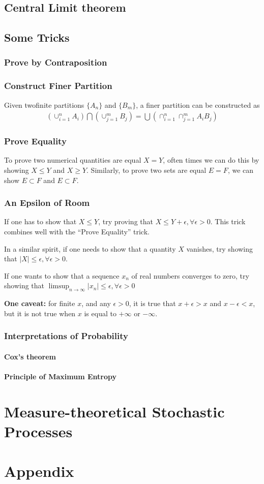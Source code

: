 \documentclass{memoir}
\begin{document}
\chapter{Central Limit theorem}

\chapter{Some Tricks}
\section{Prove by Contraposition}

\section{Construct Finer Partition}
Given twofinite partitions $\{A_n\}$ and $\{B_m\}$, a finer partition can be constructed as
\begin{align*}
	(\cup_{i=1}^n A_i) \bigcap (\cup_{j=1}^m B_j) = \bigcup (\cap_{i=1}^n \cap_{j=1}^m A_i B_j)
\end{align*}

\section{Prove Equality}
To prove two numerical quantities are equal $X=Y$, often times we can do this by showing $X \le Y$ and $X \ge Y$. Similarly, to prove two sets are equal $E = F$, we can show $E \subset F$ and $E \subset F$.

\section{An Epsilon of Room}
If one has to show that $X \le Y$, try proving that $X \le Y + \epsilon, \forall \epsilon > 0$. This trick combines well with the ``Prove Equality'' trick.

In a similar spirit, if one needs to show that a quantity $X$ vanishes, try showing that $|X| \le \epsilon, \forall \epsilon > 0$.

If one wants to show that a sequence $x_n$ of real numbers converges to zero, try showing that $\limsup_{n \to \infty} |x_n| \le \epsilon, \forall \epsilon > 0$

{\textbf{One caveat:}} for finite $x$, and any $\epsilon > 0$, it is true that $x + \epsilon > x$ and $x - \epsilon < x$, but it is not true when $x$ is equal to $+\infty$ or $-\infty$. \smallmarginpar{\textdbend}


\section{Interpretations of Probability}
\subsection{Cox's theorem}
\subsection{Principle of Maximum Entropy}

\part{Measure-theoretical Stochastic Processes}

\part{Appendix}
\end{document}
